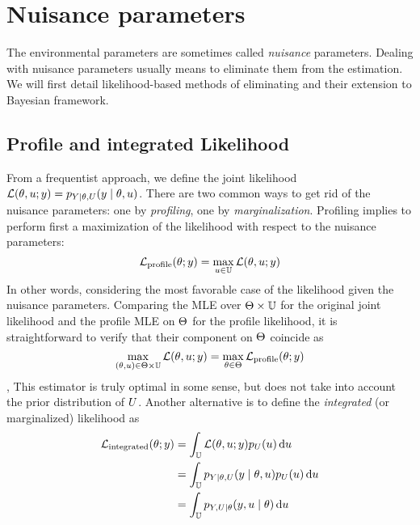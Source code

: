 \documentclass[../../Main_ManuscritThese.tex]{subfiles}
\begin{document}
\section{Nuisance parameters}
\label{sec:nuisance_parameters}
The environmental parameters are sometimes called \emph{nuisance} parameters.
Dealing with nuisance parameters usually means to eliminate them from the estimation. We will first detail likelihood-based methods of eliminating and their extension to Bayesian framework. 
\subsection{Profile and integrated Likelihood}
From a frequentist approach, we define the joint likelihood $\mathcal{L}(\theta, u ;y) = p_{Y\mid \theta,U}(y \mid \theta, u)$. There are two common ways to get rid of the nuisance parameters: one by \emph{profiling}, one by \emph{marginalization}.
Profiling implies to perform first a maximization of the likelihood with respect to the nuisance parameters:
\begin{equation}
  \label{eq:eq:def_profile_lik}
  \mathcal{L}_{\mathrm{profile}}(\theta;y) = \max_{u \in \mathbb{U}} \mathcal{L}(\theta,u;y)
\end{equation}
In other words, considering the most favorable case of the likelihood given the nuisance parameters.
Comparing the MLE over $\Theta \times \mathbb{U}$ for the original joint likelihood and the profile MLE on $\Theta$ for the profile likelihood, it is straightforward to verify that their component on $\Theta$ coincide as
\begin{equation}
  \max_{(\theta ,u) \in \Theta\times \mathbb{U}} \mathcal{L}(\theta,u;y) = \max_{\theta\in \Theta} \mathcal{L}_{\mathrm{profile}}(\theta;y)
\end{equation},
This estimator is truly optimal in some sense, but does not take into account the prior distribution of $U$.
Another alternative is to define the \emph{integrated} (or marginalized) likelihood as
\begin{align}
  \mathcal{L}_{\mathrm{integrated}}(\theta;y) &= \int_{\mathbb{U}} \mathcal{L}(\theta,u;y) p_{U}(u) \,\mathrm{d}u \\
                                              &=\int_{\mathbb{U}} p_{Y|\theta,U}(y \mid \theta,u) p_{U}(u) \,\mathrm{d}u \\
                                              &=\int_{\mathbb{U}} p_{Y,U|\theta}(y,u \mid \theta)\,\mathrm{d}u \\
\end{align}
\end{document}
